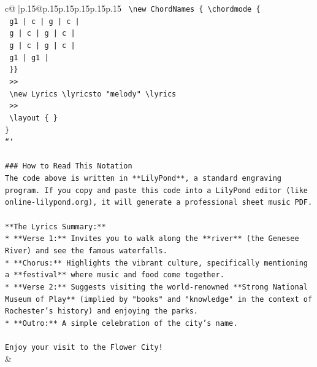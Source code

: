 \documentclass{article}
\begin{document}
{\begin{supertabular}{c@{$\;$}|p{.15\linewidth}@{}p{.15\linewidth}p{.15\linewidth}p{.15\linewidth}p{.15\linewidth}p{.15\linewidth}}
{{{\texttt{      \textbackslash{}new ChordNames \{ \textbackslash{}chordmode \{} \\
\texttt{        g1 | c | g | c |} \\
\texttt{        g | c | g | c |} \\
\texttt{        g | c | g | c |} \\
\texttt{        g1 | g1 |} \\
\texttt{      \}\}} \\
\texttt{    >>} \\
\texttt{    \textbackslash{}new Lyrics \textbackslash{}lyricsto "melody" \textbackslash{}lyrics} \\
\texttt{  >>} \\
\texttt{  \textbackslash{}layout \{ \}} \\
\texttt{\}} \\
\texttt{```} \\
\\ 
\texttt{\#\#\# How to Read This Notation} \\
\texttt{The code above is written in **LilyPond**, a standard engraving program. If you copy and paste this code into a LilyPond editor (like online{-}lilypond.org), it will generate a professional sheet music PDF.} \\
\\ 
\texttt{**The Lyrics Summary:**} \\
\texttt{*   **Verse 1:** Invites you to walk along the **river** (the Genesee River) and see the famous waterfalls.} \\
\texttt{*   **Chorus:** Highlights the vibrant culture, specifically mentioning a **festival** where music and food come together.} \\
\texttt{*   **Verse 2:** Suggests visiting the world{-}renowned **Strong National Museum of Play** (implied by "books" and "knowledge" in the context of Rochester's history) and enjoying the parks.} \\
\texttt{*   **Outro:** A simple celebration of the city's name.} \\
\\ 
\texttt{Enjoy your visit to the Flower City!} \\
            }
        }
    }
    & \\ \\


\end{supertabular}}
\end{document}
